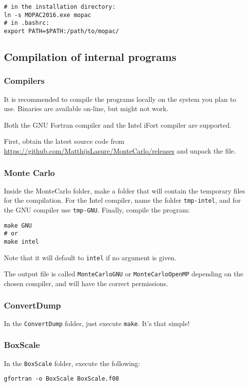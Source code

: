 \documentclass[a4paper,fleqn]{report}
\begin{document}
	\begin{lstlisting}[caption={Configuration},label=lst:configuration]
# in the installation directory:
ln -s MOPAC2016.exe mopac
# in .bashrc:
export PATH=$PATH:/path/to/mopac/
	\end{lstlisting}
	
	\subsection{Compilation of internal programs}
	
	\subsubsection{Compilers}
	It is recommended to compile the programs locally on the system you plan to 
	use. Binaries are available on-line, but might not work.
	
	Both the GNU Fortran compiler and the Intel iFort compiler are supported.
	
	First, obtain the latest source code from 
	\url{https://github.com/MatthijsLasure/MonteCarlo/releases} and unpack the 
	file.
	
	\subsubsection{Monte Carlo}
	Inside the MonteCarlo folder, make a folder that will contain the temporary 
	files for the compilation.
	For the Intel compiler, name the folder \verb|tmp-intel|, and for the GNU 
	compiler use \verb|tmp-GNU|.
	Finally, compile the program:
	\begin{lstlisting}[caption={Compilation of MonteCarlo},label=lst:makeGNU]
make GNU
# or
make intel
	\end{lstlisting}
	
	Note that it will default to \verb|intel| if no argument is given.
	
	The output file is called \verb|MonteCarloGNU| or \verb|MonteCarloOpenMP| 
	depending on the chosen compiler, and will have the correct permissions.
	
	\subsubsection{ConvertDump}
	In the \verb|ConvertDump| folder, just execute \verb|make|. It's that 
	simple!
	
	\subsubsection{BoxScale}
	In the \verb|BoxScale| folder, execute the following:
	\begin{lstlisting}[caption={Compilation of BoxScale}, 
	label=lst:makeBoxScale]
gfortran -o BoxScale BoxScale.f08
	\end{lstlisting}
	
\end{document}
